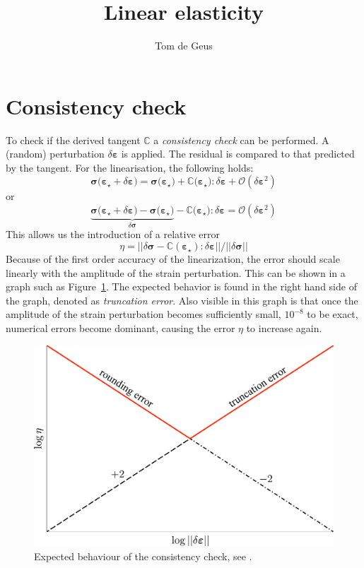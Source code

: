 \documentclass[garamond]{goose-article}
\title{Linear elasticity}
\author[1]{Tom de Geus}
\begin{document}
\maketitle



\section{Consistency check}

To check if the derived tangent $\mathbb{C}$ a \emph{consistency check} can be performed. A (random) perturbation $\delta \bm{\varepsilon}$ is applied. The residual is compared to that predicted by the tangent. For the linearisation, the following holds:
%
\begin{equation}
  \bm{\sigma}\big( \bm{\varepsilon}_\star + \delta \bm{\varepsilon} \big) =
  \bm{\sigma}\big( \bm{\varepsilon}_\star \big) +
  \mathbb{C} \big( \bm{\varepsilon}_\star \big) : \delta \bm{\varepsilon} +
  \mathcal{O}(\delta \bm{\varepsilon}^2)
\end{equation}
%
or
%
\begin{equation}
  \underbrace{
    \bm{\sigma}\big( \bm{\varepsilon}_\star + \delta \bm{\varepsilon} \big) -
    \bm{\sigma}\big( \bm{\varepsilon}_\star \big)
  }_{
    \displaystyle \delta \bm{\sigma}
  } -
  \mathbb{C} \big( \bm{\varepsilon}_\star \big) : \delta \bm{\varepsilon} =
  \mathcal{O}(\delta \bm{\varepsilon}^2)
\end{equation}
%
This allows us the introduction of a relative error
%
\begin{equation}
  \eta =
  \Big|\Big|
    \delta \bm{\sigma} -
    \mathbb{C}(\bm{\varepsilon}_\star) : \delta \bm{\varepsilon}
  \Big|\Big|
  /
  \Big|\Big| \delta \bm{\sigma} \Big|\Big|
\end{equation}
%
Because of the first order accuracy of the linearization, the error should scale linearly with the amplitude of the strain perturbation. This can be shown in a graph such as Figure~\ref{fig:newton:consistency}. The expected behavior is found in the right hand side of the graph, denoted as \textit{truncation error}. Also visible in this graph is that once the amplitude of the strain perturbation becomes sufficiently small, $10^{-8}$ to be exact, numerical errors become dominant, causing the error $\eta$ to increase again.

\begin{figure}[htp]
  \centering
  \includegraphics[width=.5\textwidth]{figures/consistency}
  \caption{Expected behaviour of the consistency check, see \citet[p.~9]{Heath2002}.}
  \label{fig:newton:consistency}
\end{figure}


\end{document}
